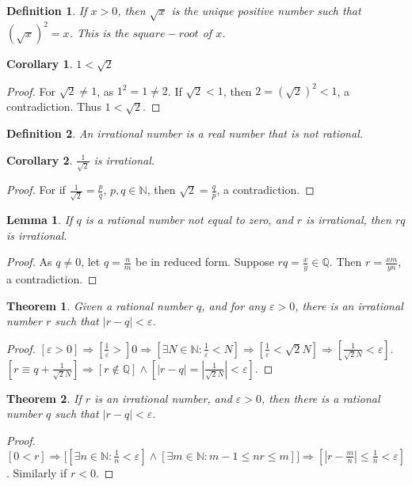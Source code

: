 \documentclass[crop=false,class=book]{standalone}
\theoremstyle{mystyle}
\newtheorem{theorem}{Theorem}[section]
\newtheorem{definition}{Definition}[section]
\newtheorem{lemma}{Lemma}[section]
\newtheorem{corollary}{Corollary}[section]
\begin{document}
\begin{definition}
If $x>0$, then $\sqrt{x}$ is the unique positive number such that $(\sqrt{x})^2 = x$. This is the $square-root$ of $x$.
\end{definition}
\begin{corollary}
$1<\sqrt{2}$
\end{corollary}
\begin{proof}
For $\sqrt{2} \ne 1$, as $1^2 = 1\ne 2$. If $\sqrt{2}<1$, then $2=(\sqrt{2})^2 <1$, a contradiction. Thus $1<\sqrt{2}$.
\end{proof}
\begin{definition}
An irrational number is a real number that is not rational.
\end{definition}
\begin{corollary}
$\frac{1}{\sqrt{2}}$ is irrational. 
\end{corollary}
\begin{proof}
For if $\frac{1}{\sqrt{2}} = \frac{p}{q}$, $p,q\in \mathbb{N}$, then $\sqrt{2} = \frac{q}{p}$, a contradiction.
\end{proof}
\begin{lemma}
If $q$ is a rational number not equal to zero, and $r$ is irrational, then $rq$ is irrational.
\end{lemma}
\begin{proof}
As $q\ne 0$, let $q = \frac{n}{m}$ be in reduced form. Suppose $rq = \frac{x}{y}\in \mathbb{Q}$. Then $r=\frac{xm}{yn}$, a contradiction.
\end{proof}
\begin{theorem}
Given a rational number $q$, and for any $\varepsilon>0$, there is an irrational number $r$ such that $|r-q|<\varepsilon$.
\end{theorem}
\begin{proof}
$[\varepsilon>0]\Rightarrow [\frac{1}{\varepsilon}>]0\Rightarrow [\exists N\in \mathbb{N}:\frac{1}{\varepsilon}<N]\Rightarrow [\frac{1}{\varepsilon} < \sqrt{2}N]\Rightarrow [\frac{1}{\sqrt{2}N}< \varepsilon]$. $[r \equiv q+\frac{1}{\sqrt{2}{N}}]\Rightarrow [r\notin \mathbb{Q}]\land [|r-q| = |\frac{1}{\sqrt{2}N}| < \varepsilon]$.
\end{proof}
\begin{theorem}
If $r$ is an irrational number, and $\varepsilon>0$, then there is a rational number $q$ such that $|r-q|<\varepsilon$.
\end{theorem}
\begin{proof}
$[0<r]\Rightarrow \big[[\exists n\in \mathbb{N}: \frac{1}{n} < \varepsilon]\land[\exists m\in \mathbb{N}: m-1\leq nr \leq m]\big]\Rightarrow[|r-\frac{m}{n}| \leq \frac{1}{n} < \varepsilon]$. Similarly if $r<0$.
\end{proof}
\end{document}
